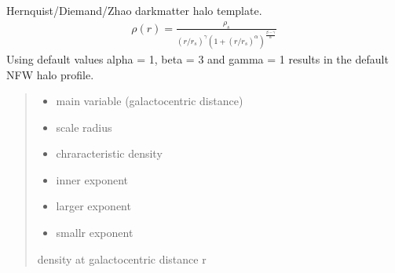 \documentclass[letterpaper,10pt,english]{sphinxmanual}
\begin{document}
\begin{fulllineitems}
\label{\detokenize{diffsph.profiles:diffsph.profiles.templates.hdz}}
\pysigstartsignatures
{}
\pysigstopsignatures
\sphinxAtStartPar
Hernquist/Diemand/Zhao dark\sphinxhyphen{}matter halo template.
\begin{equation*}
\begin{split}\rho(r) = \frac{\rho_s}{(r/r_s)^\gamma(1+(r/r_s)^\alpha)^{\frac{\beta-\gamma}\alpha}}\end{split}
\end{equation*}
\sphinxAtStartPar
Using default values alpha = 1, beta = 3 and gamma = 1 results in the default NFW halo profile.
\begin{quote}\begin{description}
\begin{itemize}
\item {} 
\sphinxAtStartPar
{} \textendash{} main variable (galactocentric distance)

\item {} 
\sphinxAtStartPar
{} \textendash{} scale radius

\item {} 
\sphinxAtStartPar
{} \textendash{} chraracteristic density

\item {} 
\sphinxAtStartPar
{} \textendash{} inner exponent

\item {} 
\sphinxAtStartPar
{} \textendash{} large\sphinxhyphen{}r exponent

\item {} 
\sphinxAtStartPar
{} \textendash{} small\sphinxhyphen{}r exponent

\end{itemize}

\sphinxAtStartPar
density at galactocentric distance r

\end{description}\end{quote}

\end{fulllineitems}
\end{document}
